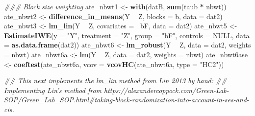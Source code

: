 \documentclass[
  12pt,
]{book}
\newenvironment{Shaded}{\begin{snugshade}}{\end{snugshade}}
\newcommand{\CommentTok}[1]{\textcolor[rgb]{0.56,0.35,0.01}{\textit{#1}}}
\newcommand{\DataTypeTok}[1]{\textcolor[rgb]{0.13,0.29,0.53}{#1}}
\newcommand{\KeywordTok}[1]{\textcolor[rgb]{0.13,0.29,0.53}{\textbf{#1}}}
\newcommand{\NormalTok}[1]{#1}
\newcommand{\OperatorTok}[1]{\textcolor[rgb]{0.81,0.36,0.00}{\textbf{#1}}}
\newcommand{\OtherTok}[1]{\textcolor[rgb]{0.56,0.35,0.01}{#1}}
\newcommand{\StringTok}[1]{\textcolor[rgb]{0.31,0.60,0.02}{#1}}
\theoremstyle{definition}
\theoremstyle{definition}
\theoremstyle{definition}
\theoremstyle{remark}
\begin{document}
\begin{Shaded}
\begin{Highlighting}[]
\CommentTok{### Block size weighting}
\NormalTok{ate_nbwt1 <-}\StringTok{ }\KeywordTok{with}\NormalTok{(datB, }\KeywordTok{sum}\NormalTok{(taub }\OperatorTok{*}\StringTok{ }\NormalTok{nbwt))}
\NormalTok{ate_nbwt2 <-}\StringTok{ }\KeywordTok{difference_in_means}\NormalTok{(Y }\OperatorTok{~}\StringTok{ }\NormalTok{Z, }\DataTypeTok{blocks =}\NormalTok{ b, }\DataTypeTok{data =}\NormalTok{ dat2)}
\NormalTok{ate_nbwt3 <-}\StringTok{ }\KeywordTok{lm_lin}\NormalTok{(Y }\OperatorTok{~}\StringTok{ }\NormalTok{Z, }\DataTypeTok{covariates =} \OperatorTok{~}\NormalTok{bF, }\DataTypeTok{data =}\NormalTok{ dat2)}
\NormalTok{ate_nbwt5 <-}\StringTok{ }\KeywordTok{EstimateIWE}\NormalTok{(}\DataTypeTok{y =} \StringTok{"Y"}\NormalTok{, }\DataTypeTok{treatment =} \StringTok{"Z"}\NormalTok{, }\DataTypeTok{group =} \StringTok{"bF"}\NormalTok{, }\DataTypeTok{controls =} \OtherTok{NULL}\NormalTok{, }\DataTypeTok{data =} \KeywordTok{as.data.frame}\NormalTok{(dat2))}
\NormalTok{ate_nbwt6 <-}\StringTok{ }\KeywordTok{lm_robust}\NormalTok{(Y }\OperatorTok{~}\StringTok{ }\NormalTok{Z, }\DataTypeTok{data =}\NormalTok{ dat2, }\DataTypeTok{weights =}\NormalTok{ nbwt)}
\NormalTok{ate_nbwt6a <-}\StringTok{ }\KeywordTok{lm}\NormalTok{(Y }\OperatorTok{~}\StringTok{ }\NormalTok{Z, }\DataTypeTok{data =}\NormalTok{ dat2, }\DataTypeTok{weights =}\NormalTok{ nbwt)}
\NormalTok{ate_nbwt6ase <-}\StringTok{ }\KeywordTok{coeftest}\NormalTok{(ate_nbwt6a, }\DataTypeTok{vcov =} \KeywordTok{vcovHC}\NormalTok{(ate_nbwt6a, }\DataTypeTok{type =} \StringTok{"HC2"}\NormalTok{))}

\CommentTok{## This next implements the lm_lin method from Lin 2013 by hand:}
\CommentTok{## Implementing Lin's method from https://alexandercoppock.com/Green-Lab-SOP/Green_Lab_SOP.html#taking-block-randomization-into-account-in-ses-and-cis.}


\end{Highlighting}
\end{Shaded}
\end{document}
